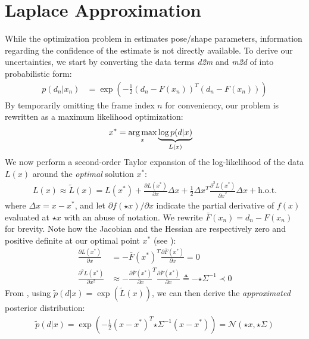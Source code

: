 \appendix
%
\section{Laplace Approximation}
\label{app:laplace-approximation}

While the optimization problem in  estimates pose/shape parameters, information regarding the confidence of the estimate is not directly available. To derive our uncertainties, we start by converting the data terms \emph{d2m} and \emph{m2d} of  into probabilistic form:
\begin{align}
p(d_n|x_n) &= \exp \left( - \tfrac{1}{2}(d_n - F(x_n))^T (d_n - F(x_n)) \right)
\label{eq:posterior}
\end{align}
% 
By temporarily omitting the frame index $n$ for conveniency, our problem is rewritten as a maximum likelihood optimization:
%
\begin{align}
x^* &= \operatorname*{arg\,max}_{x} \underbrace{\log  p(d|x)}_{L(x)}
\label{eq:independent}
\end{align}
%
We now perform a second-order Taylor expansion of the log-likelihood of the data $L(x)$ around the \emph{optimal} solution $x^*$:
%
\begin{align}
L(x) \approx \tilde{L}(x) = L(x^*)   
+ \tfrac{\partial L(x^*) }{\partial x}  \Delta x 
+ \tfrac{1}{2} \Delta x^T\tfrac{\partial^2 L(x^*)}{{\partial x}^2} \Delta x + \text{h.o.t.}
\label{eq:taylor}
\end{align}
%
where $\Delta x=x - x^*$, and let {\small $\partial f(\star{x})/\partial x$} indicate the partial derivative of $f(x)$ evaluated at $\star{x}$  with an abuse of notation. We rewrite {\small $\bar{F}(x_n) = d_n - F(x_n)$} for brevity. Note how the Jacobian and the Hessian are respectively zero and positive definite at our optimal point $x^*$ (see \cite[Sec.~10.2]{nocedal2006numerical}):
%
\begin{align}
\tfrac{\partial L(x^*)}{\partial x} &= - \bar{F}(x^*)^T 
\tfrac{\partial \bar{F}(x^*)}{\partial x} = 0 
\label{eq:taylor-jacobian}
\\
\tfrac{\partial^2 L(x^*)}{\partial x^2} 
& \approx - \tfrac{\partial \bar{F}(x^*)}{\partial x}^T \tfrac{\partial \bar{F}(x^*)}{\partial x}
\triangleq %
-{\star{\Sigma}}^{-1} \prec 0
\label{eq:taylor-hessian}
\end{align}
% 
From , using $\tilde p(d|x) = \exp (\tilde{L}(x))$, we can then derive the \emph{approximated} posterior distribution:
%
\begin{align}
\tilde{p}(d|x) = \exp\left(- \tfrac{1}{2}(x - x^*)^T {\star{\Sigma}}^{-1}  (x - x^*) \right) = \mathcal{N}\left(\star{x}, \star{\Sigma} \right)
\end{align}
%

